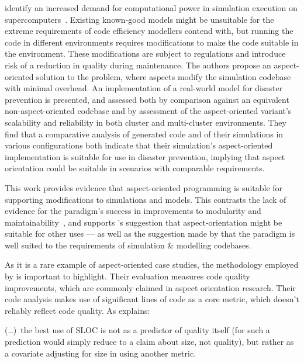 \citeauthor{ionescu2009aspect} identify an increased demand for computational power in
simulation execution on supercomputers~\cite{ionescu2009aspect}. Existing
known-good models might be unsuitable for the extreme requirements of code
efficiency modellers contend with, but running the code in different
environments requires modifications to make the code suitable in the
environment. These modifications are subject to regulations and introduce risk
of a reduction in quality during maintenance. The authors propose an
aspect-oriented solution to the problem, where aspects modify the simulation
codebase with minimal overhead. An implementation of a real-world model for
disaster prevention is presented, and assessed both by comparison against an
equivalent non-aspect-oriented codebase and by assessment of the aspect-oriented
variant's scalability and reliability in both cluster and multi-cluster
environments. They find that a comparative analysis of generated code and of
their simulations in various configurations both indicate that their
simulation's aspect-oriented implementation is suitable for use in disaster
prevention, implying that aspect orientation could be suitable in scenarios with
comparable requirements.

This work provides evidence that aspect-oriented programming is suitable for
supporting modifications to simulations and models. This contrasts the lack of
evidence for the paradigm's success in improvements to modularity and
maintainability~\cite{przybylek2010wrong,Constantinides04aopconsidered}, and
supports \citet{Steimann06paradoxical}'s suggestion that aspect-orientation
might be suitable for other uses --- as well as the suggestion made by
\citet{gulyas1999use} that the paradigm is well suited to the requirements of
simulation \& modelling codebases.

As it is a rare example of aspect-oriented case studies, the methodology
employed by \citeauthor{ionescu2009aspect} is important to highlight. Their
evaluation measures code quality improvements, which are commonly claimed in
aspect orientation research. Their code
analysis makes use of significant lines of code as a core metric, which doesn't
reliably reflect code quality. As \citet{rosenberg1997some} explains:

\begin{displayquote}
    (\ldots{})~the best use of SLOC is not as a predictor of quality
itself (for such a prediction would simply reduce to a claim about size, not
quality), but rather as a covariate adjusting for size in using another
metric.
\end{displayquote}

